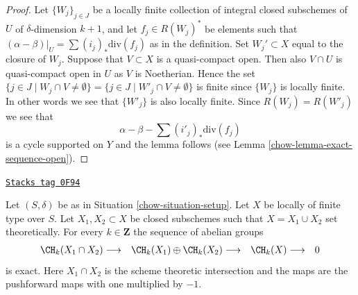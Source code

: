 \begin{proof}

Let $\{W_j\}_{j \in J}$ be a locally finite collection of integral closed
subschemes of $U$ of $\delta$-dimension $k + 1$, and let $f_j \in R(W_j)^*$
be elements such that $(\alpha - \beta)|_U = \sum (i_j)_*\text{div}(f_j)$
as in the definition. Set $W_j' \subset X$ equal
to the closure of $W_j$. Suppose that $V \subset X$ is a quasi-compact
open. Then also $V \cap U$ is quasi-compact open in $U$ as
$V$ is Noetherian. Hence the set
$\{j \in J \mid W_j \cap V \not = \emptyset\}
= \{j \in J \mid W'_j \cap V \not = \emptyset\}$
is finite since $\{W_j\}$ is locally finite. In other words we see that
$\{W'_j\}$ is also locally finite. Since $R(W_j) = R(W'_j)$ we see
that
$$
\alpha - \beta - \sum (i'_j)_*\text{div}(f_j)
$$
is a cycle supported on $Y$ and the lemma follows (see
Lemma \ref{chow-lemma-exact-sequence-open}).
\end{proof}

\begin{lemma}
\label{chow-lemma-exact-sequence-closed-chow}
\href{https://stacks.math.columbia.edu/tag/0F94}{\texttt{Stacks tag 0F94}}

Let $(S, \delta)$ be as in Situation \ref{chow-situation-setup}.
Let $X$ be locally of finite type over $S$. Let $X_1, X_2 \subset X$
be closed subschemes such that $X = X_1 \cup X_2$ set theoretically.
For every $k \in \mathbf{Z}$ the sequence of abelian groups
$$
\begin{array}{cccc}\CH_k(X_1 \cap X_2) \longrightarrow & \CH_k(X_1) \oplus \CH_k(X_2) \longrightarrow & \CH_k(X) \longrightarrow & 0\end{array}
$$
is exact. Here $X_1 \cap X_2$ is the scheme theoretic intersection and the
maps are the pushforward maps with one multiplied by $-1$.
\end{lemma}

